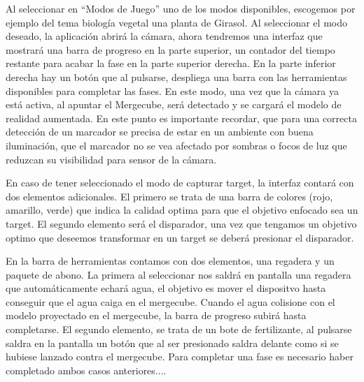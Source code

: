 Al seleccionar en ``Modos de Juego'' uno de los modos disponibles, escogemos por ejemplo del tema biología vegetal una planta de Girasol. Al seleccionar el modo deseado, la aplicación abrirá la cámara, ahora tendremos una interfaz que mostrará una barra de progreso en la parte superior, un contador del tiempo restante para acabar la fase en la parte superior derecha. En la parte inferior derecha hay un botón que al pulsarse, despliega una barra con las herramientas disponibles para completar las fases.
En este modo, una vez que la cámara ya está activa, al apuntar el Mergecube, será detectado y se cargará el modelo de realidad aumentada. En este punto es importante recordar, que para una correcta detección de un marcador se precisa de estar en un ambiente con buena iluminación, que el marcador no se vea afectado por sombras o focos de luz que reduzcan su visibilidad para sensor de la cámara.

En caso de tener seleccionado el modo de capturar target, la interfaz contará con dos elementos adicionales. El primero se trata de una barra de colores (rojo, amarillo, verde) que indica la calidad optima para que el objetivo enfocado sea un target. El segundo elemento será el disparador, una vez que tengamos un objetivo optimo que deseemos transformar en un target se deberá presionar el disparador.

En la barra de herramientas contamos con dos elementos, una regadera y un paquete de abono. La primera al seleccionar nos saldrá en pantalla una regadera que automáticamente echará agua, el objetivo es mover el dispositvo hasta conseguir que el agua caiga en el mergecube. Cuando el agua colisione con el modelo proyectado en el mergecube, la barra de progreso subirá hasta completarse. El segundo elemento, se trata de un bote de fertilizante, al pulsarse saldra en la pantalla un botón que al ser presionado saldra delante como si se hubiese lanzado contra el mergecube.
Para completar una fase es necesario haber completado ambos casos anteriores....


 

